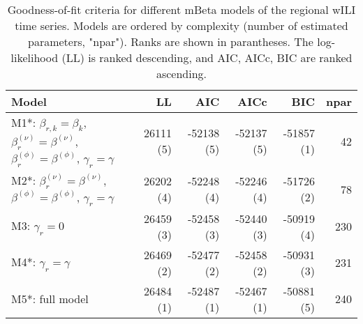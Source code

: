 \begin{table}[ht]
\centering
\begingroup\fontsize{9pt}{10pt}\selectfont
\begin{tabular}{l|rrrrr}
  \hline
Model & LL & AIC & AICc & BIC & npar \\ 
  \hline
M1*: $\beta_{r,k} = \beta_{k}$, $\beta_{r}^{(\nu)} = \beta^{(\nu)}$, $\beta_{r}^{(\phi)} = \beta^{(\phi)}$, $\gamma_r = \gamma$ & 26111 (5) & -52138 (5) & -52137 (5) & -51857 (1) & 42 \\ 
  M2*: $\beta_{r}^{(\nu)} = \beta^{(\nu)}$, $\beta^{(\phi)} = \beta^{(\phi)}$, $\gamma_r = \gamma$ & 26202 (4) & -52248 (4) & -52246 (4) & -51726 (2) & 78 \\ 
  M3: $\gamma_r = 0$ & 26459 (3) & -52458 (3) & -52440 (3) & -50919 (4) & 230 \\ 
  M4*: $\gamma_r = \gamma$ & 26469 (2) & -52477 (2) & -52458 (2) & -50931 (3) & 231 \\ 
  M5*: full model & 26484 (1) & -52487 (1) & -52467 (1) & -50881 (5) & 240 \\ 
   \hline
\end{tabular}
\endgroup
\caption{Goodness-of-fit criteria for different mBeta models of the regional wILI time series.
             Models are ordered by complexity (number of estimated parameters, "npar").
             Ranks are shown in parantheses.
             The log-likelihood (LL) is ranked descending,
             and AIC, AICc, BIC are ranked ascending.} 
\label{tab:mBetafit}
\end{table}

